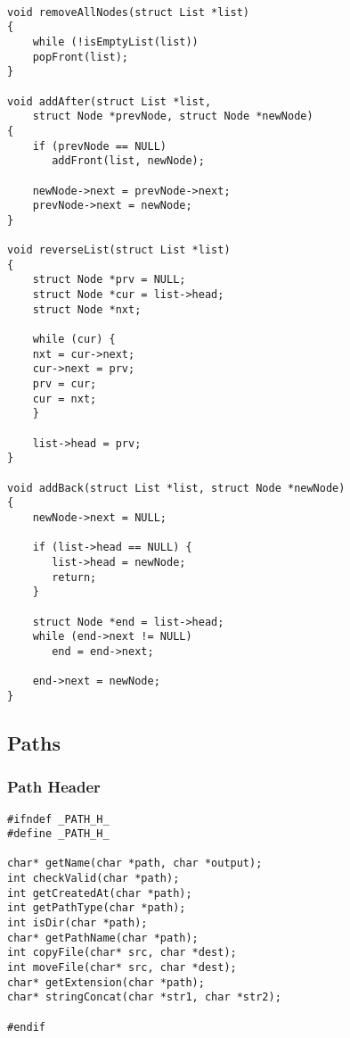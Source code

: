 \documentclass[11pt]{article}
\begin{document}
\begin{listing}[H]
  \begin{verbatim}

void removeAllNodes(struct List *list)
{
    while (!isEmptyList(list))
    popFront(list);
}

void addAfter(struct List *list,
    struct Node *prevNode, struct Node *newNode)
{
    if (prevNode == NULL)
       addFront(list, newNode);

    newNode->next = prevNode->next;
    prevNode->next = newNode;
}

void reverseList(struct List *list)
{
    struct Node *prv = NULL;
    struct Node *cur = list->head;
    struct Node *nxt;

    while (cur) {
    nxt = cur->next;
    cur->next = prv;
    prv = cur;
    cur = nxt;
    }

    list->head = prv;
}

void addBack(struct List *list, struct Node *newNode)
{
    newNode->next = NULL;

    if (list->head == NULL) {
       list->head = newNode;
       return;
    }

    struct Node *end = list->head;
    while (end->next != NULL)
       end = end->next;

    end->next = newNode;
}
  \end{verbatim}
\end{listing}

\newpage

\subsection{Paths}

\subsubsection{Path Header}

\begin{listing}[H]
  \begin{verbatim}
#ifndef _PATH_H_
#define _PATH_H_

char* getName(char *path, char *output);
int checkValid(char *path);
int getCreatedAt(char *path);
int getPathType(char *path);
int isDir(char *path);
char* getPathName(char *path);
int copyFile(char* src, char *dest);
int moveFile(char* src, char *dest);
char* getExtension(char *path);
char* stringConcat(char *str1, char *str2);

#endif
  \end{verbatim}
\end{listing}
\end{document}
